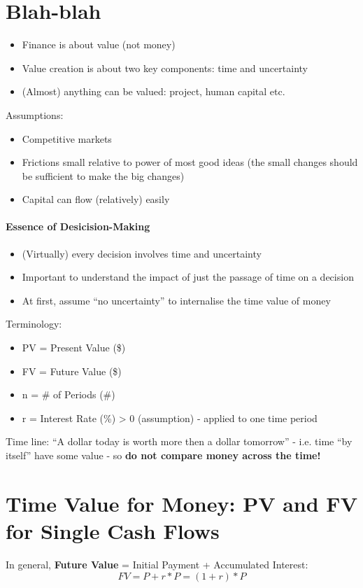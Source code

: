 \documentclass{scrartcl}
\begin{document}
\section{Blah-blah}
\label{sec:1}

\begin{itemize}
\item Finance is about value (not money)
\item Value creation is about two key components: time and uncertainty
\item (Almost) anything can be valued: project, human capital etc.
\end{itemize}

Assumptions:
\begin{itemize}
\item Competitive markets
\item Frictions small relative to power of most good ideas (the small changes
  should be sufficient to make the big changes)
\item Capital can flow (relatively) easily
\end{itemize}

\paragraph{Essence of Desicision-Making}
\begin{itemize}
\item (Virtually) every decision involves time and uncertainty
\item Important to understand the impact of just the passage of time on a
  decision
\item At first, assume ``no uncertainty'' to internalise the time value of money
\end{itemize}
Terminology:
\begin{itemize}
\item PV = Present Value (\$)
\item FV = Future Value (\$)
\item n = \# of Periods (\#)
\item r = Interest Rate (\%) > 0 (assumption) - applied to one time period
\end{itemize}
Time line: ``A dollar today is worth more then a dollar tomorrow'' - i.e. time
``by itself'' have some value - so {\bf do not compare money across the time!}

\section {Time Value for Money: PV and FV for Single Cash Flows}
\label{sec:2}
In general, {\bf Future Value} = Initial Payment + Accumulated Interest: $$FV =
P + r * P = (1+r) * P$$
\end{document}
